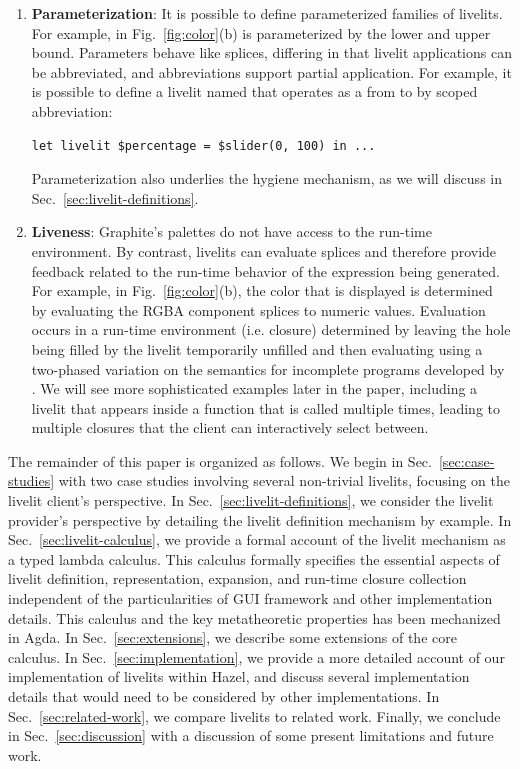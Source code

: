 \begin{enumerate}
  \item \textbf{Parameterization}: It is possible to define parameterized families of livelits. 
  For example,  in Fig.~\ref{fig:color}(b) is parameterized by the lower and upper bound. 
  Parameters behave like splices, differing in that livelit applications can be abbreviated, and abbreviations
  support partial application. For example, it is possible to define a livelit named  
  that operates as a  from  to  by scoped abbreviation:
  \begin{lstlisting}[numbers=none]
  let livelit $percentage = $slider(0, 100) in ...
  \end{lstlisting}
  Parameterization also underlies the hygiene mechanism, as we will discuss in Sec.~\ref{sec:livelit-definitions}.

  \item \textbf{Liveness}: Graphite's palettes do not have 
  access to the run-time environment. By contrast, livelits can evaluate splices
  and therefore provide feedback related to the run-time behavior of the expression being generated. 
  For example, in Fig.~\ref{fig:color}(b), the color that is displayed is determined by evaluating the RGBA 
  component splices to numeric values.
  Evaluation occurs in a run-time environment (i.e. closure) determined by 
  leaving the hole being filled by the livelit temporarily unfilled and then evaluating
  using a two-phased variation on the semantics for incomplete programs developed by \citet{HazelnutLive}. 
  We will see more sophisticated examples later in the paper, including a livelit 
  that appears inside a function that is called multiple times, leading to multiple closures that the client can 
  interactively select between.
\end{enumerate}

The remainder of this paper is organized as follows. We begin in Sec.~\ref{sec:case-studies} with two case studies 
involving several non-trivial livelits, focusing on the livelit client's perspective. 
In Sec.~\ref{sec:livelit-definitions}, we consider the livelit provider's perspective by detailing the livelit
definition mechanism by example. 
In Sec.~\ref{sec:livelit-calculus}, we provide a formal account of the livelit mechanism as a typed lambda calculus. 
This calculus formally specifies the essential aspects of livelit definition, representation, expansion, 
and run-time closure collection independent of the particularities of GUI framework and other implementation details. 
This calculus and the key metatheoretic properties has been mechanized in Agda.
In Sec.~\ref{sec:extensions}, we describe some extensions of the core calculus.
In Sec.~\ref{sec:implementation}, we provide a more detailed account of our implementation of livelits within Hazel, 
and discuss several implementation details that would need to be considered by other implementations.  
In Sec.~\ref{sec:related-work}, we compare livelits to related work. 
Finally, we conclude in Sec.~\ref{sec:discussion} with a discussion of some present limitations and future work.